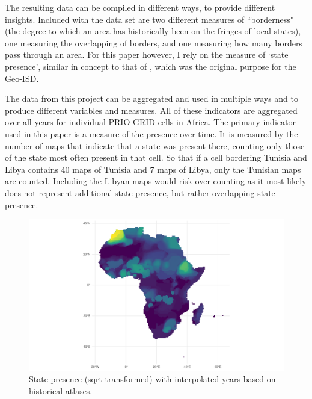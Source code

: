 \documentclass[12pt]{article}
\begin{document}

The resulting data can be compiled in different ways, to provide different
insights. Included with the data set are two different measures of
``borderness" (the degree to which an area has historically been on the fringes
of local states), one measuring the overlapping of borders, and one measuring
how many borders pass through an area. For this paper however, I rely on the
measure of `state presence', similar in concept to that of
\citet{Depetris-Chauvin2016}, which was the original purpose for the Geo-ISD.

The data from this project can be aggregated and used in multiple ways and to
produce different variables and measures. All of these indicators are aggregated
over all years for individual PRIO-GRID cells in Africa. The primary indicator
used in this paper is a measure of the presence over time. It is measured by the
number of maps that indicate that a state was present there, counting only those
of the state most often present in that cell. So that if a cell bordering
Tunisia and Libya contains 40 maps of Tunisia and 7 maps of Libya, only the
Tunisian maps are counted. Including the Libyan maps would risk over counting as
it most likely does not represent additional state presence, but rather
overlapping state presence. 


\begin{figure}[htpb]
	\centering
	\includegraphics[width=\linewidth]{../R/Output/sqrtSpAll.pdf}
	\caption{State presence (sqrt transformed) with interpolated years based
	on historical atlases.}
	\label{Sp_i}
\end{figure}
\end{document}
